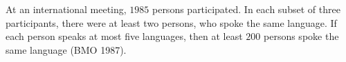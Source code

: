 At an international meeting, $1985$ persons participated. In each subset of three participants, there were at least two persons, who spoke the same language. If each person speaks at most five languages, then at least $200$ persons spoke the same language (BMO 1987).
